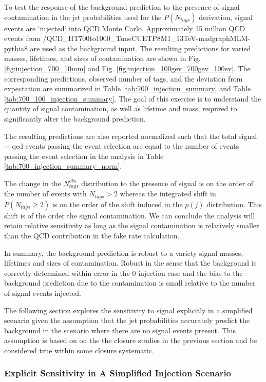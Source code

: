 To test the response of the background prediction to the presence of signal contamination in the jet probabilities used for the $P(N_{tags})$ derivation,
signal events are `injected` into QCD Monte Carlo. Approximately 15 million QCD events from /QCD\_HT700to1000\_TuneCUETP8M1\_13TeV-madgraphMLM-pythia8 are used as the background input.
The resulting predictions for varied masses, lifetimes, and sizes of contamination are shown in Fig. \ref{fig:injection_700_10mm} and Fig. \ref{fig:injection_100gev_700gev_100ev}. The corresponding predictions, observed number of tags, and the
deviation from expectation are summarized in Table \ref{tab:700_injection_summary}  and Table \ref{tab:700_100_injection_summary}. The goal of this exercise
is to understand the quantity of signal contamination, as well as lifetime and mass, required to significantly alter the background prediction. 

The resulting predictions are also reported normalized such that the total signal + qcd events passing the event selection are equal to the number of events passing the
event selection in the analysis in Table \ref{tab:700_injection_summary_norm}.

The change in the $N_{tags}^{obs}$ distribution to the presence of signal is on the order of the number of events with $N_{tags}>2$ whereas 
the integrated shift in $P(N_{tags}\geq2)$ is on the order of the shift induced in the $p(j)$ distribution. This shift is of the order the signal contamination. 
We can conclude the analysis will retain relative sensitivity as long as the signal contamination is relatively smaller than the QCD contribution in 
the fake rate calculation. 

In summary, the background prediction is robust to a variety signal masses, lifetimes and sizes of contamination. Robust in the sense that the
background is correctly determined within error in the 0 injection case and the bias to the background prediction due to the 
contamination is small relative to the number of signal events injected.

The following section explores the  sensitivity to signal explicitly in a simplified scenario given the assumption that the jet probabilities accurately predict the
background in the scenario where there are no signal events present. This assumption is based on on the the closure studies in the previous section and be considered
true within some closure systematic.

\subsubsection{Explicit Sensitivity in A Simplified Injection Scenario}

